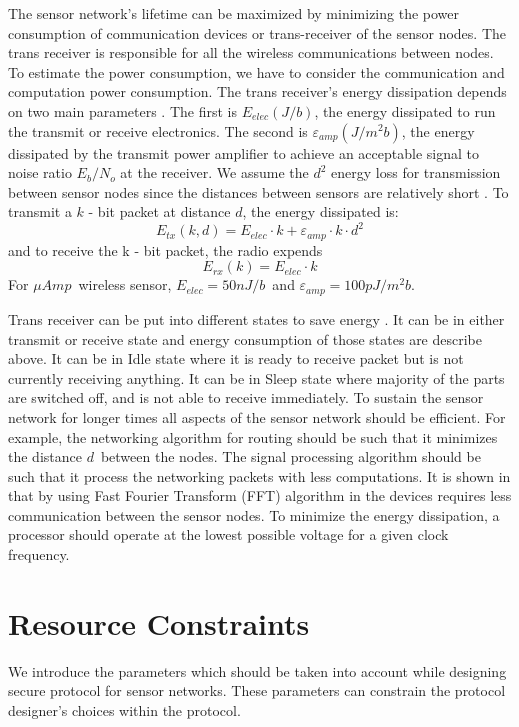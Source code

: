 	The sensor network's lifetime can be maximized by minimizing the power consumption of communication devices or trans-receiver of the sensor nodes.
	The trans receiver is responsible for all the wireless communications between nodes.
	To estimate the power consumption, we have to consider the communication and computation power consumption.
	The trans receiver's energy dissipation depends on two main parameters \cite{wang2002energy}.
	The first is $E_{elec} (J/b)$, the energy dissipated to run the transmit or receive electronics.
	The second is $\varepsilon_{amp} (J/m^2 b)$, the energy dissipated by the transmit power amplifier to achieve an acceptable signal to noise ratio $E_{b} / N_{o} $ at the receiver.
	We assume the $d^2$ energy loss for transmission between sensor nodes since the distances between sensors are relatively short \cite{ettus1998system}. 
	To transmit a $k$ - bit packet at distance $d$, the energy dissipated is:
	\begin{equation}
		E_{tx}(k, d) = E_{elec} \cdot k + \varepsilon_{amp} \cdot k \cdot d^{2}
	\end{equation}
	and to receive the k - bit packet, the radio expends
	\begin{equation}
		E_{rx}(k) = E_{elec} \cdot k
	\end{equation}
	For $\mu Amp$\ wireless sensor, $E_{elec} = 50nJ/b$\ and $\varepsilon_{amp} = 100pJ/m^2 b$.

	Trans receiver can be put into different states to save energy \cite{karl2007protocols}.
	It can be in either transmit or receive state and energy consumption of those states are describe above.
	It can be in Idle state where it is ready to receive packet but is not currently receiving anything.
	It can be in Sleep state where majority of the parts are switched off, and is not able to receive immediately. 
 	To sustain the sensor network for longer times all aspects of the sensor network should be efficient.
	For example, the networking algorithm for routing should be such that it minimizes the distance $d$\ between the nodes.
	The signal processing algorithm should be such that it process the networking packets with less computations.
	It is shown in \cite{wang2002energy} that by using Fast Fourier Transform (FFT) algorithm in the devices requires less communication between the sensor nodes.
	To minimize the energy dissipation, a processor should operate at the lowest possible voltage for a given clock frequency.

\section{Resource Constraints}
	\label{sec:aggregate-adversary}
	We introduce the parameters which should be taken into account while designing secure protocol for sensor networks.  
	These parameters can constrain the protocol designer's choices within the protocol.

